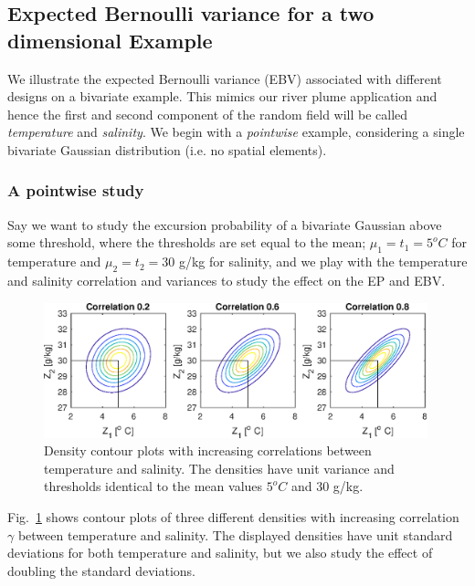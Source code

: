 \documentclass[aoas]{imsart}
\begin{document}
\subsection{Expected Bernoulli variance for a two dimensional Example}
\label{Sec:UnivarEx}

We illustrate the expected Bernoulli variance (EBV) associated with
different designs on a bivariate example. This mimics our river plume
application and hence the first and second component of the random
field will be called \textit{temperature} and \textit{salinity}. We
begin with a \textit{pointwise} example, considering a single
bivariate Gaussian distribution (i.e. no spatial elements).

\subsubsection{A pointwise study}

Say we want to study the excursion probability of a bivariate Gaussian
above some threshold, where the thresholds are set equal to the mean;
$\mu_1=t_1=5^o C$ for temperature and $\mu_2=t_2=30$ g/kg for
salinity, and we play with the temperature and salinity correlation
and variances to study the effect on the EP and EBV.

\begin{figure}[!b] 
\centering
\includegraphics[width=0.99\textwidth]{Figures/illus_bivar.eps}
\caption{Density contour plots with increasing correlations between
  temperature and salinity. The densities have unit variance and
  thresholds identical to the mean values $5^o C$ and
  $30$ g/kg.}
\label{illus_bivarDens}
\end{figure}

Fig.~\ref{illus_bivarDens} shows contour plots of three different
densities with increasing correlation $\gamma$ between temperature and
salinity. The displayed densities have unit standard deviations for
both temperature and salinity, but we also study the effect of
doubling the standard deviations.
\end{document}
